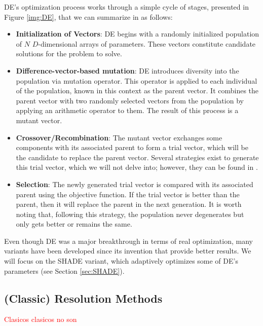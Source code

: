 \documentclass[review]{elsarticle}
\begin{document}
DE's optimization process works through a simple cycle of stages, presented in Figure \ref{img:DE}, that we can summarize in as follows:

\begin{itemize}
	
	\item \textbf{Initialization of Vectors}: DE begins with a randomly initialized population of $N$ $D$-dimensional arrays of parameters. These vectors constitute candidate solutions for the problem to solve.
	
	\item \textbf{Difference-vector-based mutation}: DE introduces diversity into the population via mutation operator. This operator is applied to each individual of the population, known in this context as the parent vector. It combines the parent vector with two randomly selected vectors from the population by applying an arithmetic operator to them. The result of this process is a mutant vector.
	
	\item \textbf{Crossover/Recombination}: The mutant vector exchanges some components with its associated parent to form a trial vector, which will be the candidate to replace the parent vector. Several strategies exist to generate this trial vector, which we will not delve into; however, they can be found in \cite{das2011differential}.
	
	\item \textbf{Selection}: The newly generated trial vector is compared with its associated parent using the objective function. If the trial vector is better than the parent, then it will replace the parent in the next generation. It is worth noting that, following this strategy, the population never degenerates but only gets better or remains the same.
	
\end{itemize}

Even though DE was a major breakthrough in terms of real optimization, many variants have been developed since its invention that provide better results. We will focus on the SHADE variant, which adaptively optimizes some of DE's parameters (see Section \ref{sec:SHADE}).

\subsection{(Classic) Resolution Methods}

\textcolor{red}{Clasicos clasicos no son}
\end{document}
